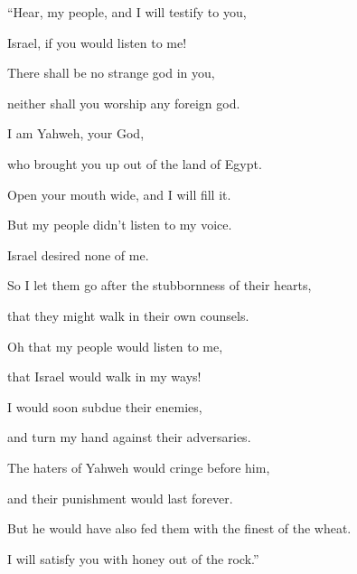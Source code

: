 {\BB \par }{\Q {}“Hear, my people, and I will testify to you,
\par }{\QB Israel, if you would listen to me!
\par }{\Q {}There shall be no strange god in you,
\par }{\QB neither shall you worship any foreign god.
\par }{\Q {}I am Yahweh, your God,
\par }{\QB who brought you up out of the land of Egypt.
\par }{\QB Open your mouth wide, and I will fill it.
\par }{\Q {}But my people didn’t listen to my voice.
\par }{\QB Israel desired none of me.
\par }{\Q {}So I let them go after the stubbornness of their hearts,
\par }{\QB that they might walk in their own counsels.
\par }{\Q {}Oh that my people would listen to me,
\par }{\QB that Israel would walk in my ways!
\par }{\Q {}I would soon subdue their enemies,
\par }{\QB and turn my hand against their adversaries.
\par }{\Q {}The haters of Yahweh would cringe before him,
\par }{\QB and their punishment would last forever.
\par }{\Q {}But he would have also fed them with the finest of the wheat.
\par }{\QB I will satisfy you with honey out of the rock.”

\par }
